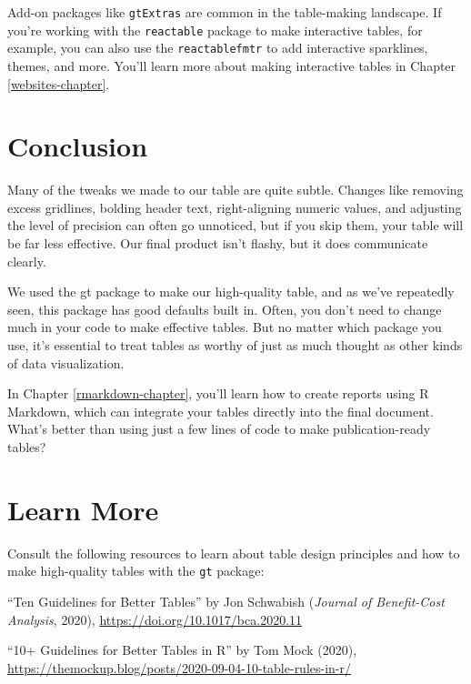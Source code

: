 \documentclass[
]{book}
\begin{document}
Add-on packages like \texttt{gtExtras} are common in the table-making landscape. If you're working with the \texttt{reactable} package to make interactive tables, for example, you can also use the \texttt{reactablefmtr} to add interactive sparklines, themes, and more. You'll learn more about making interactive tables in Chapter \ref{websites-chapter}.

\hypertarget{conclusion-2}{%
\section*{Conclusion}\label{conclusion-2}}

Many of the tweaks we made to our table are quite subtle. Changes like removing excess gridlines, bolding header text, right-aligning numeric values, and adjusting the level of precision can often go unnoticed, but if you skip them, your table will be far less effective. Our final product isn't flashy, but it does communicate clearly.

We used the gt package to make our high-quality table, and as we've repeatedly seen, this package has good defaults built in. Often, you don't need to change much in your code to make effective tables. But no matter which package you use, it's essential to treat tables as worthy of just as much thought as other kinds of data visualization.

In Chapter \ref{rmarkdown-chapter}, you'll learn how to create reports using R Markdown, which can integrate your tables directly into the final document. What's better than using just a few lines of code to make publication-ready tables?

\hypertarget{learn-more-4}{%
\section*{Learn More}\label{learn-more-4}}

Consult the following resources to learn about table design principles and how to make high-quality tables with the \texttt{gt} package:

``Ten Guidelines for Better Tables'' by Jon Schwabish (\emph{Journal of Benefit-Cost Analysis}, 2020), \url{https://doi.org/10.1017/bca.2020.11}

``10+ Guidelines for Better Tables in R'' by Tom Mock (2020), \url{https://themockup.blog/posts/2020-09-04-10-table-rules-in-r/}
\end{document}
